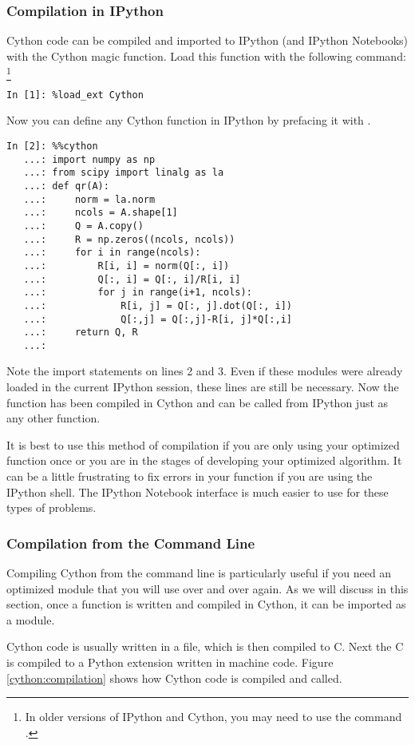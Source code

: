 \subsubsection*{Compilation in IPython}
Cython code can be compiled and imported to IPython (and IPython Notebooks) with the Cython magic function.
Load this function with the following command:
\footnote{In older versions of IPython and Cython, you may need to use the command .}
\begin{lstlisting}
In [1]: %load_ext Cython
\end{lstlisting}
Now you can define any Cython function in IPython by prefacing it with .
\begin{lstlisting}
In [2]: %%cython
   ...: import numpy as np
   ...: from scipy import linalg as la
   ...: def qr(A):
   ...:     norm = la.norm
   ...:     ncols = A.shape[1]
   ...:     Q = A.copy()
   ...:     R = np.zeros((ncols, ncols))
   ...:     for i in range(ncols):
   ...:         R[i, i] = norm(Q[:, i])
   ...:         Q[:, i] = Q[:, i]/R[i, i]
   ...:         for j in range(i+1, ncols):
   ...:             R[i, j] = Q[:, j].dot(Q[:, i])
   ...:             Q[:,j] = Q[:,j]-R[i, j]*Q[:,i]
   ...:     return Q, R
   ...:
\end{lstlisting}
Note the import statements on lines 2 and 3. Even if these modules were already loaded in the current IPython session, these lines are still be necessary. Now the  function has been compiled in Cython and can be called from IPython just as any other function.

It is best to use this method of compilation if you are only using your optimized function once or you are in the stages of developing your optimized algorithm. It can be a little frustrating to fix errors in your function if you are using the IPython shell. The IPython Notebook interface is much easier to use for these types of problems.

\subsubsection*{Compilation from the Command Line}
Compiling Cython from the command line is particularly useful if you need an optimized module that you will use over and over again. As we will discuss in this section, once a function is written and compiled in Cython, it can be imported as a module.

Cython code is usually written in a  file, which is then compiled to C.
Next the C is compiled to a Python extension written in machine code.
Figure \ref{cython:compilation} shows how Cython code is compiled and called.

